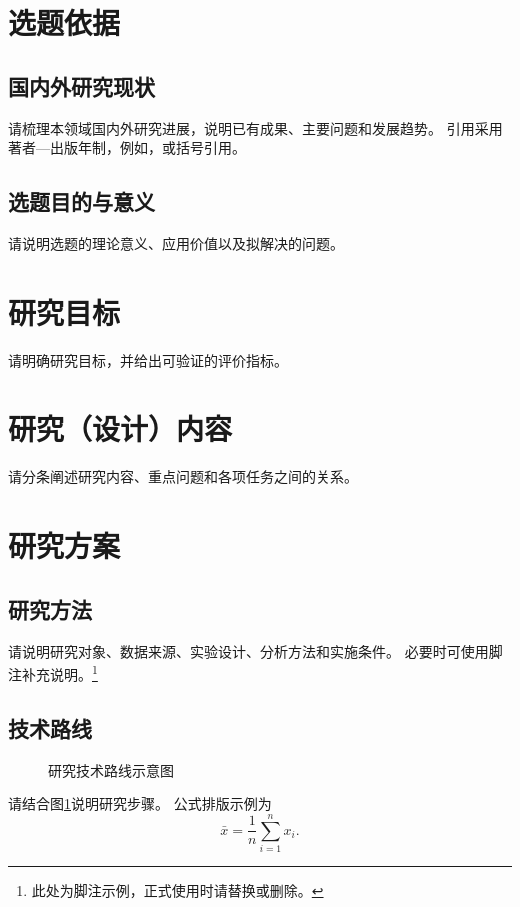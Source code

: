 \documentclass{nwafu-proposal}
\begin{document}
\makeproposalcover
\makereporttitle

\section{选题依据}
\subsection{国内外研究现状}
请梳理本领域国内外研究进展，说明已有成果、主要问题和发展趋势。
引用采用著者—出版年制，例如\citet{huang2004}，或括号引用\citep{hull2002}。

\subsection{选题目的与意义}
请说明选题的理论意义、应用价值以及拟解决的问题。

\section{研究目标}
请明确研究目标，并给出可验证的评价指标。

\section{研究（设计）内容}
请分条阐述研究内容、重点问题和各项任务之间的关系。

\section{研究方案}
\subsection{研究方法}
请说明研究对象、数据来源、实验设计、分析方法和实施条件。
必要时可使用脚注补充说明。\footnote{此处为脚注示例，正式使用时请替换或删除。}

\subsection{技术路线}
\begin{figure}[htbp]
\centering
{}
\caption{研究技术路线示意图}
\label{fig:workflow}
\end{figure}
请结合图\ref{fig:workflow}说明研究步骤。
公式排版示例为
\begin{equation}
\bar{x}=\frac{1}{n}\sum_{i=1}^{n}x_i .
\end{equation}
\end{document}
